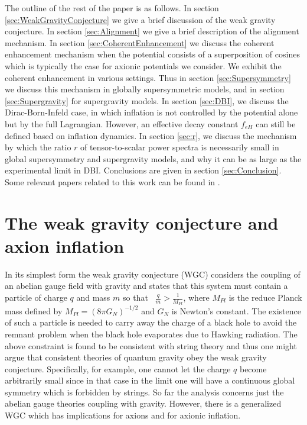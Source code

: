 \documentclass[12pt]{article}
\begin{document}
The outline of the rest of the paper is as follows.
In section \ref{sec:WeakGravityConjecture} we give a brief discussion of the weak gravity conjecture.
In section \ref{sec:Alignment} we give a brief description of the alignment mechanism.
In section \ref{sec:CoherentEnhancement} we discuss the coherent enhancement mechanism when the potential consists of a superposition of cosines which is typically the case for axionic potentials we consider.
We exhibit the coherent enhancement in various settings.
Thus in section \ref{sec:Supersymmetry} we discuss this mechanism in globally supersymmetric models, and in section \ref{sec:Supergravity} for supergravity models.
In section \ref{sec:DBI}, we discuss the Dirac-Born-Infeld case, in which inflation is not controlled by the potential alone but by the full Lagrangian.
However, an effective decay constant $f_{eH}$ can still be defined based on inflation dynamics.
In section \ref{sec:r}, we discuss the mechanism by which the ratio $r$ of tensor-to-scalar power spectra is necessarily small in global supersymmetry and supergravity models, and why it can be as large as the experimental limit in DBI.
Conclusions are given in section \ref{sec:Conclusion}.
Some relevant papers related to this work can be found in \cite{BlancoPillado:2006he, Conlon:2005jm, Ben-Dayan:2014lca, Gao:2014uha}.

\section{The weak gravity conjecture and axion inflation \label{sec:WeakGravityConjecture}}
In its simplest form the weak gravity conjecture (WGC) considers the coupling of an abelian gauge field with gravity and states that this system must contain a particle of charge $q$ and mass $m$ so that~\cite{ArkaniHamed:2006dz} $\frac{q}{m} > \frac{1}{M_{Pl}}$, 
where $M_{Pl}$ is the reduce Planck mass defined by $M_{Pl}= (8\pi G_N)^{-1/2}$ and $G_N$ is Newton's constant. 
The existence of such a particle is needed to carry away the charge of a black hole to avoid the remnant problem when the black hole evaporates due to Hawking radiation.
The above constraint is found to be consistent with string theory and thus one might argue that consistent theories of quantum gravity obey the weak gravity conjecture.
Specifically, for example, one cannot let the charge $q$ become arbitrarily small since in that case in the limit one will have a continuous global symmetry which is forbidden by strings.
So far the analysis concerns just the abelian gauge theories coupling with gravity.
However, there is a generalized WGC which has implications for axions and for axionic inflation.
\end{document}
